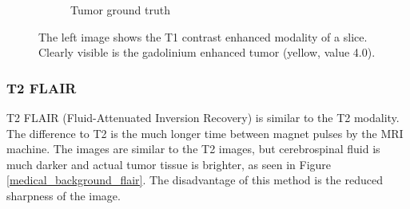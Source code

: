\begin{figure}[H]
\begin{subfigure}{.5\textwidth}
        \caption{Tumor ground truth}
    \end{subfigure}
    \caption{The left image shows the T1 contrast enhanced modality of a slice. Clearly visible is the gadolinium enhanced tumor (yellow, value 4.0).}
    \label{medical_background_t1ce}
\end{figure}



\subsubsection{T2 FLAIR}
T2 FLAIR (Fluid-Attenuated Inversion Recovery) \cite{mribasics} is similar to the T2 modality. The difference to T2 is the much longer time between magnet pulses by the MRI machine.
The images are similar to the T2 images, but cerebrospinal fluid is much darker and actual tumor tissue is brighter, as seen in Figure \ref{medical_background_flair}. The disadvantage
of this method is the reduced sharpness of the image.

